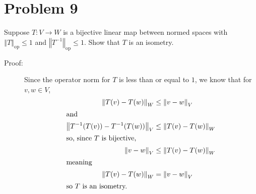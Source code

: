 \documentclass[8pt]{extarticle}
\newcommand{\norm}[1]{\left\Vert #1\right\Vert}
\begin{document}
  \section{Problem 9}%
  Suppose $T: V\rightarrow W$ is a bijective linear map between normed spaces with $\norm{T}_{\text{op}} \leq 1$ and $\norm{T^{-1}}_{\text{op}}\leq 1$. Show that $T$ is an isometry.
  \begin{description}
    \item[Proof:] Since the operator norm for $T$ is less than or equal to $1$, we know that for $v,w\in V$,
      \begin{align*}
        \norm{T(v)-T(w)}_{W} &\leq \norm{v-w}_{V}\\
        \intertext{and}
        \norm{T^{-1}(T(v)) - T^{-1}(T(w))}_{V} &\leq \norm{T(v)-T(w)}_{W}\\
        \intertext{so, since $T$ is bijective,}
        \norm{v-w}_{V} &\leq \norm{T(v)-T(w)}_{W}\\
        \intertext{meaning}
        \norm{T(v)-T(w)}_{W} &= \norm{v-w}_{V}\\
        \intertext{so $T$ is an isometry.}
      \end{align*}
  \end{description}
\end{document}
